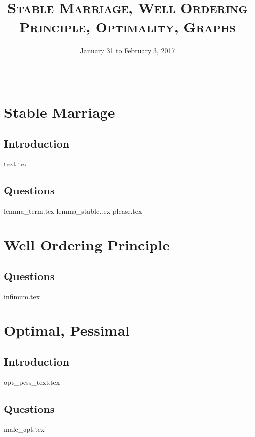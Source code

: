 \documentclass{exam}
\title{\textsc{Stable Marriage, Well Ordering Principle, Optimality, Graphs}}
\date{January 31 to February 3, 2017}
\begin{document}
\maketitle
\rule{\textwidth}{0.15em}
\fontsize{12}{15}\selectfont
\thispagestyle{empty}


\section{Stable Marriage}
\subsection{Introduction}
{text.tex}
\subsection{Questions}
\begin{questions}
{lemma_term.tex}
{lemma_stable.tex}
{please.tex}
\end{questions}

\section{Well Ordering Principle}
\subsection{Questions}
\begin{questions}
{infimum.tex}
\end{questions}

\section{Optimal, Pessimal}
\subsection{Introduction}
{opt_pess_text.tex}
\subsection{Questions}
\begin{questions}
{male_opt.tex}
\end{questions}
\end{document}

